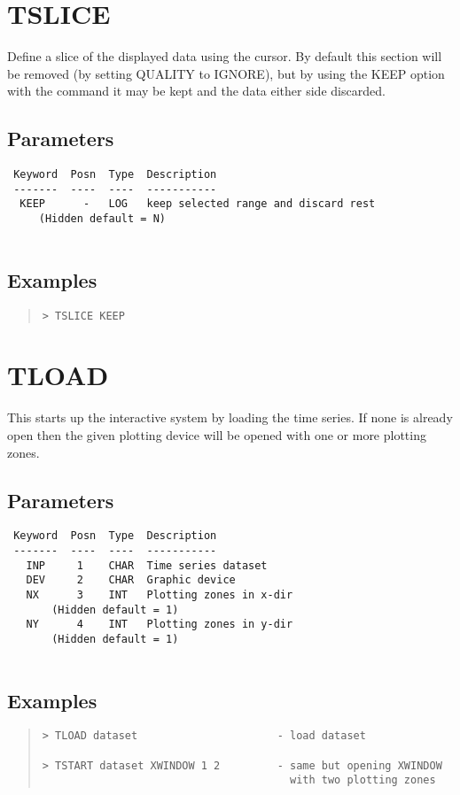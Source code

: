 \documentclass{book}
\renewcommand{\_}{{\tt\char'137}}     %
\begin{document}
\section{TSLICE}
Define a slice of the displayed data using the cursor. By
default this section will be removed (by setting QUALITY to IGNORE),
but by using the KEEP option with the command it may be kept and
the data either side discarded.
 
\subsection{Parameters}
\begin{verbatim}
 Keyword  Posn  Type  Description
 -------  ----  ----  -----------
  KEEP      -   LOG   keep selected range and discard rest
     (Hidden default = N)
 
\end{verbatim}\subsection{Examples}
\begin{quote}\begin{verbatim}
> TSLICE KEEP
\end{verbatim}\end{quote}
\section{TLOAD}
This starts up the interactive system by loading the time series.
If none is already open then the given plotting device will be opened
with one or more plotting zones.
 
\subsection{Parameters}
\begin{verbatim}
 Keyword  Posn  Type  Description
 -------  ----  ----  -----------
   INP     1    CHAR  Time series dataset
   DEV     2    CHAR  Graphic device
   NX      3    INT   Plotting zones in x-dir
       (Hidden default = 1)
   NY      4    INT   Plotting zones in y-dir
       (Hidden default = 1)
 
\end{verbatim}\subsection{Examples}
\begin{quote}\begin{verbatim}
> TLOAD dataset                      - load dataset
 
> TSTART dataset XWINDOW 1 2         - same but opening XWINDOW
                                       with two plotting zones
\end{verbatim}\end{quote}
\end{document}
